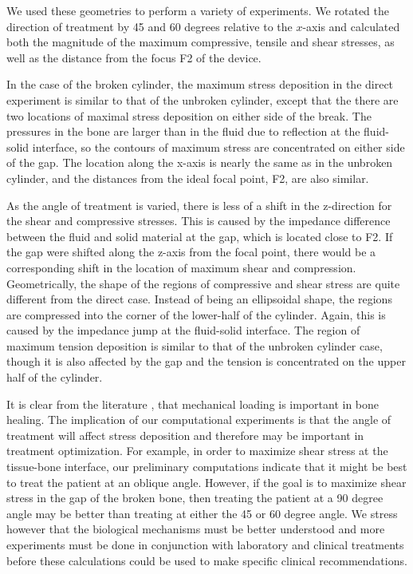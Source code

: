 \documentclass{article}
\begin{document}
We used these geometries to perform a variety of experiments.   We rotated the direction of treatment by 45 and 60 degrees relative to the $x$-axis and calculated both the magnitude of the maximum compressive, tensile and shear stresses, as well as the distance from the focus F2 of the device. 

In the case of the broken cylinder, the maximum stress deposition in the direct experiment is similar to that of the unbroken cylinder, except that the there are two locations of maximal stress deposition on either side of the break.  The pressures in the bone are larger than in the fluid due to reflection at the fluid-solid interface, so the contours of maximum stress are concentrated on either side of the gap.  The location along the x-axis is nearly the same as in the unbroken cylinder, and the distances from the ideal focal point, F2, are also similar. 

As the angle of treatment is varied, there is less of a shift in the z-direction for the shear and compressive stresses.  This is caused by the impedance difference between the fluid and solid material at the gap, which is located close to F2.  If the gap were shifted along the z-axis from the focal point, there would be a corresponding shift in the location of maximum shear and compression.  Geometrically, the shape of the regions of compressive and shear stress are quite different from the direct case.  Instead of being an ellipsoidal shape, the regions are compressed into the corner of the lower-half of the cylinder.  Again, this is caused by the impedance jump at the fluid-solid interface.  The region of maximum tension deposition is similar to that of the unbroken cylinder case, though it is also affected by the gap and the tension is concentrated on the upper half of the cylinder.  


It is clear from the literature
\cite{park1998,prendergast1997,lacroix2002,claes1999,isaksson2006,carter1998,goodship1985},
that mechanical loading is important in bone healing. The implication of our
computational experiments is that the angle of treatment will affect stress
deposition and therefore may be important in treatment optimization.  For
example, in order to maximize shear stress at the tissue-bone interface, our
preliminary computations indicate that it might be best to treat the patient at an oblique angle.  However, if the goal is to maximize shear stress in the gap of the broken bone, then treating the patient at a 90 degree angle may be better than treating at either the 45 or 60 degree angle.  We stress however that the biological mechanisms must be better understood and more experiments must be done in conjunction with laboratory and clinical treatments before these calculations could be used to make specific clinical recommendations. 
\end{document}
